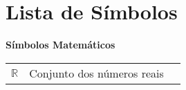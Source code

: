 
\chapter*{Lista de Símbolos}

\begin{spacing}{1.45}

\noindent \textbf{Símbolos Matemáticos}

\begin{longtable}{L{1.5cm}L{14cm}L{\textwidth}}

$\mathbb{R}$ & Conjunto dos números reais & \\



\end{longtable}

\end{spacing}
